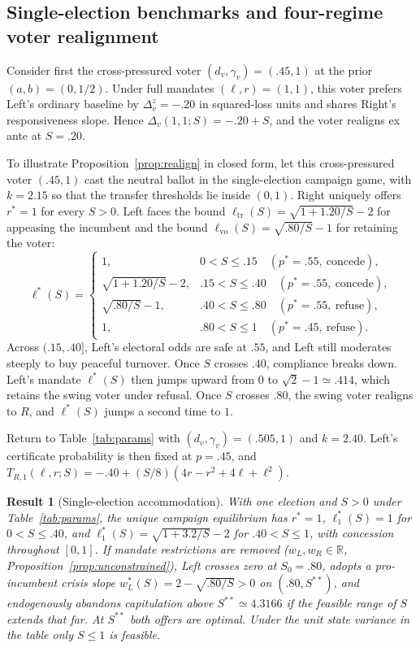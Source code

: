 \documentclass[11pt,letterpaper]{article}
\newtheorem{result}{Result}
\begin{document}
\subsection{Single-election benchmarks and four-regime voter realignment}

Consider first the cross-pressured voter $(d_v,\gamma_v)=(.45,1)$ at the prior $(a,b)=(0,1/2)$. Under full mandates $(\ell,r)=(1,1)$, this voter prefers Left's ordinary baseline by $\Delta_v^z=-.20$ in squared-loss units and shares Right's responsiveness slope. Hence $\Delta_v(1,1;S)=-.20+S$, and the voter realigns ex ante at $S=.20$.

To illustrate Proposition~\ref{prop:realign} in closed form, let this cross-pressured voter $(.45,1)$ cast the neutral ballot in the single-election campaign game, with $k=2.15$ so that the transfer thresholds lie inside $(0,1)$. Right uniquely offers $r^*=1$ for every $S>0$. Left faces the bound $\ell_{\mathrm{tr}}(S)=\sqrt{1+1.20/S}-2$ for appeasing the incumbent and the bound $\ell_{\mathrm{vo}}(S)=\sqrt{.80/S}-1$ for retaining the voter:
\[
 \ell^*(S)=
 \begin{cases}
 1, & 0<S\le .15 \quad (p^*=.55,\ \text{concede}),\\
 \sqrt{1+1.20/S}-2, & .15<S\le .40 \quad (p^*=.55,\ \text{concede}),\\
 \sqrt{.80/S}-1, & .40<S\le .80 \quad (p^*=.55,\ \text{refuse}),\\
 1, & .80<S\le 1 \quad (p^*=.45,\ \text{refuse}).
 \end{cases}
\]
Across $(.15,.40]$, Left's electoral odds are safe at $.55$, and Left still moderates steeply to buy peaceful turnover. Once $S$ crosses $.40$, compliance breaks down. Left's mandate $\ell^*(S)$ then jumps upward from $0$ to $\sqrt{2}-1\simeq .414$, which retains the swing voter under refusal. Once $S$ crosses $.80$, the swing voter realigns to $R$, and $\ell^*(S)$ jumps a second time to $1$.

Return to Table~\ref{tab:params} with $(d_v,\gamma_v)=(.505,1)$ and $k=2.40$. Left's certificate probability is then fixed at $p=.45$, and $T_{R,1}(\ell,r;S)=-.40+(S/8)(4r-r^2+4\ell+\ell^2)$.

\begin{result}[Single-election accommodation]\label{cor:onet}
With one election and $S>0$ under Table~\ref{tab:params}, the unique campaign equilibrium has $r^*=1$, $\ell_1^*(S)=1$ for $0<S\le .40$, and $\ell_1^*(S)=\sqrt{1+3.2/S}-2$ for $.40<S\le 1$, with concession throughout $[0,1]$. If mandate restrictions are removed ($w_L,w_R\in\mathbb R$, Proposition~\ref{prop:unconstrained}), Left crosses zero at $S_0=.80$, adopts a pro-incumbent crisis slope $w_L^*(S)=2-\sqrt{.80/S}>0$ on $(.80,S^{**})$, and endogenously abandons capitulation above $S^{**}\simeq 4.3166$ if the feasible range of $S$ extends that far. At $S^{**}$ both offers are optimal. Under the unit state variance in the table only $S\le1$ is feasible.
\end{result}
\end{document}
